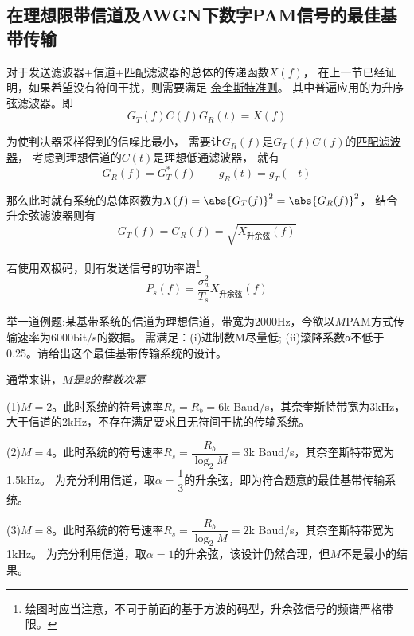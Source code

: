 \subsection{在理想限带信道及AWGN下数字PAM信号的最佳基带传输}
    对于发送滤波器+信道+匹配滤波器的总体的传递函数$X(f)$，
    在上一节已经证明，如果希望没有符间干扰，则需要满足
    \hyperref[thm:Nyquist]{奈奎斯特准则}。
    其中普遍应用的为升序弦滤波器。即
    \begin{equation}
        G_T(f)C(f)G_R(t)=X(f)
    \end{equation}

    为使判决器采样得到的信噪比最小，
    需要让$G_R(f)$是$G_T(f)C(f)$的\hyperref[subsec:matched-filter]{匹配滤波器}，
    考虑到理想信道的$C(t)$是理想低通滤波器，
    就有
    \begin{equation}
        G_R(f)=G_T^*(f)\hspace{2em}g_R(t)=g_T(-t)
    \end{equation}

    那么此时就有系统的总体函数为$X(f)=\abs{G_T(f)}^2=\abs{G_R(f)}^2$，
    结合升余弦滤波器则有
    \begin{equation}
        G_T(f)=G_R(f)=\sqrt{X_{\text{升余弦}}(f)}
    \end{equation}

    若使用双极码，则有发送信号的功率谱\footnote{绘图时应当注意，不同于前面的基于方波的码型，升余弦信号的频谱严格带限。}
    \begin{equation}
        P_s(f)=\frac{\sigma_a^2}{T_s}X_{\text{升余弦}}(f)
    \end{equation}

    举一道例题:某基带系统的信道为理想信道，带宽为2000Hz，今欲以$M$PAM方式传输速率为6000bit/s的数据。
    需满足：(i)进制数M尽量低; (ii)滚降系数α不低于0.25。请给出这个最佳基带传输系统的设计。

    通常来讲，\emph{$M$是2的整数次幂}

    (1)$M=2$。此时系统的符号速率$R_s=R_b=6$k Baud/s，其奈奎斯特带宽为3kHz，大于信道的2kHz，不存在满足要求且无符间干扰的传输系统。

    (2)$M=4$。此时系统的符号速率$R_s=\dfrac{R_b}{\log_2M}=3$k Baud/s，其奈奎斯特带宽为1.5kHz。
    为充分利用信道，取$\alpha=\dfrac{1}{3}$的升余弦，即为符合题意的最佳基带传输系统。

    (3)$M=8$。此时系统的符号速率$R_s=\dfrac{R_b}{\log_2M}=2$k Baud/s，其奈奎斯特带宽为1kHz。
    为充分利用信道，取$\alpha=1$的升余弦，该设计仍然合理，但$M$不是最小的结果。

